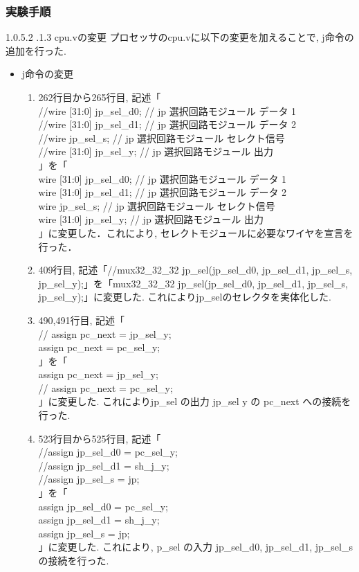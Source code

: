 \documentclass[epsf,a4paper,dvipdfmx,autodetect-engine,titlepage]{jsarticle}
\makeatletter
\newcommand{\subsubsubsection}
{\@startsection{paragraph}{4}{\z@}%
{1.0\Cvs \@plus.5\Cdp \@minus.2\Cdp}%
{.1\Cvs \@plus.3\Cdp}%
{\reset@font\sffamily\normalsize}}
\makeatother
\begin{document}
\subsubsection{実験手順}
\subsubsubsection{cpu.vの変更}
プロセッサのcpu.vに以下の変更を加えることで, j命令の追加を行った.
\begin{itemize}
    \item j命令の変更
\begin{enumerate}
    \item 262行目から265行目, 記述「 \\ 
  //wire  [31:0]     jp\_sel\_d0;  // jp 選択回路モジュール データ 1\\
  //wire  [31:0]     jp\_sel\_d1;  // jp 選択回路モジュール データ 2\\
  //wire              jp\_sel\_s;  // jp 選択回路モジュール セレクト信号\\
  //wire  [31:0]      jp\_sel\_y;  // jp 選択回路モジュール 出力\\」を「 \\ 
  wire  [31:0]     jp\_sel\_d0;  // jp 選択回路モジュール データ 1\\
  wire  [31:0]     jp\_sel\_d1;  // jp 選択回路モジュール データ 2\\
  wire              jp\_sel\_s;  // jp 選択回路モジュール セレクト信号\\
  wire  [31:0]      jp\_sel\_y;  // jp 選択回路モジュール 出力\\」に変更した．これにより, セレクトモジュールに必要なワイヤを宣言を行った．

    \item 409行目, 記述「//mux32\_32\_32  jp\_sel(jp\_sel\_d0, jp\_sel\_d1, jp\_sel\_s, jp\_sel\_y);」を「mux32\_32\_32  jp\_sel(jp\_sel\_d0, jp\_sel\_d1, jp\_sel\_s, jp\_sel\_y);」に変更した. これによりjp\_selのセレクタを実体化した.

    \item 490,491行目, 記述「\\
  //  assign pc\_next = jp\_sel\_y;\\
    assign pc\_next = pc\_sel\_y;\\
    」を「\\
    assign pc\_next = jp\_sel\_y;\\
  //  assign pc\_next = pc\_sel\_y;\\
    」に変更した. これによりjp\_sel の出力 jp\_sel y の pc\_next への接続を行った.

    \item 523行目から525行目, 記述「\\
  //assign jp\_sel\_d0 = pc\_sel\_y;\\
  //assign jp\_sel\_d1 = sh\_j\_y;\\
  //assign jp\_sel\_s = jp;\\」を「\\
    assign jp\_sel\_d0 = pc\_sel\_y;\\
    assign jp\_sel\_d1 = sh\_j\_y;\\
    assign jp\_sel\_s = jp;\\」に変更した. これにより, p\_sel の入力 jp\_sel\_d0, jp\_sel\_d1, jp\_sel\_s の接続を行った.
\end{enumerate}
\end{itemize}
\end{document}
